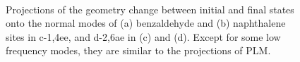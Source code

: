 \begin{figure}[!h]
\\
\caption{Projections of the geometry change between initial and final states onto the normal modes of (a) benzaldehyde and (b) naphthalene sites in c-1,4ee, and d-2,6ae in (c) and (d). Except for some low frequency modes, they are similar to the projections of PLM. \label{geomDiffFragProj}}
\end{figure}


